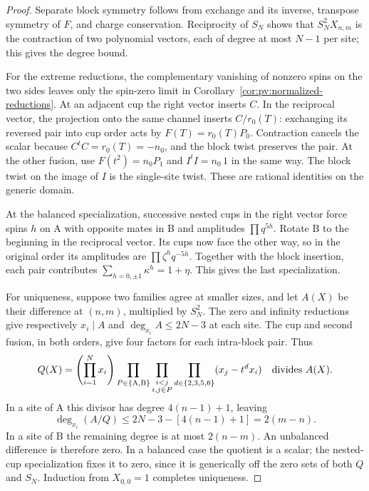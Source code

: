 \begin{proof}
Separate block symmetry follows from exchange and its inverse,
transpose symmetry of \(F\), and charge conservation. Reciprocity
of \(S_N\) shows that \(S_N^2X_{n,m}\) is the contraction of two
polynomial vectors, each of degree at most \(N-1\) per site; this
gives the degree bound.

For the extreme reductions, the complementary vanishing of nonzero
spins on the two sides leaves only the spin-zero limit in
Corollary~\ref{cor:pv:normalized-reductions}. At an adjacent cup the
right vector inserts \(C\). In the reciprocal vector, the projection
onto the same channel inserts \(C/r_0(T)\): exchanging its reversed
pair into cup order acts by \(F(T)=r_0(T)P_0\). Contraction cancels
the scalar because \(C^tC=r_0(T)=-n_0\), and the block twist
preserves the pair. At the other fusion, use
\(F(t^2)=n_0P_1\) and \(I^tI=n_0\,1\) in the same way.
The block twist on the image of \(I\) is the single-site twist.
These are rational identities on the generic domain.

At the balanced specialization, successive nested cups in the right
vector force spins \(h\) on A with opposite mates in B and amplitudes
\(\prod q^{5h}\). Rotate B to the beginning in the reciprocal vector.
Its cups now face the other way, so in the original order its amplitudes
are \(\prod\zeta^h q^{-5h}\). Together with the block insertion,
each pair contributes \(\sum_{h=0,\pm1}\kappa^h=1+\eta\).
This gives the last specialization.

For uniqueness, suppose two families agree at smaller sizes, and let
\(A(X)\) be their difference at \((n,m)\), multiplied by \(S_N^2\).
The zero and infinity reductions give respectively
\(x_i\mid A\) and \(\deg_{x_i}A\le2N-3\) at each site. The
cup and second fusion, in both orders, give four factors for each
intra-block pair. Thus
\[
 Q(X)=\left(\prod_{i=1}^Nx_i\right)
 \prod_{P\in\{\mathrm A,\mathrm B\}}
 \prod_{\substack{i<j\\i,j\in P}}
 \prod_{d\in\{2,3,5,6\}}(x_j-t^d x_i)
 \quad\hbox{divides }A(X).
\]
In a site of A this divisor has degree \(4(n-1)+1\), leaving
\[
 \deg_{x_i}(A/Q)\le2N-3-[4(n-1)+1]=2(m-n).
\]
In a site of B the remaining degree is at most \(2(n-m)\).
An unbalanced difference is therefore zero. In a balanced case the
quotient is a scalar; the nested-cup specialization fixes it to zero,
since it is generically off the zero sets of both \(Q\) and \(S_N\).
Induction from \(X_{0,0}=1\) completes uniqueness.
\end{proof}
